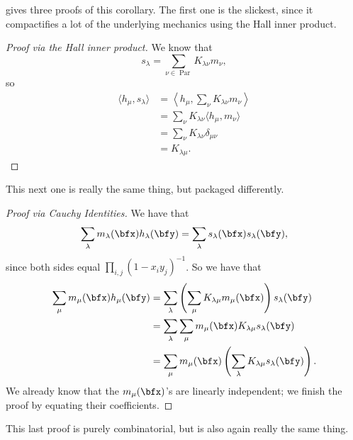\documentclass{article}
\DeclareMathOperator{\Par}{Par}
\begin{document}
\cite{Stanley} gives three proofs of this corollary. The first one is the slickest, since it compactifies a lot of the underlying mechanics using the Hall inner product.

\begin{proof}[Proof via the Hall inner product]
    We know that
    \[
        s_\lambda = \sum_{\nu\in\Par} K_{\lambda\nu} m_\nu,
    \]
    so 
    \begin{align*}
        \langle h_\mu, s_\lambda \rangle &= \left\langle h_\mu, \sum_\nu K_{\lambda\nu} m_\nu \right\rangle \\
                                         &=\sum_{\nu} K_{\lambda\nu} \langle h_\mu, m_\nu \rangle \\
                                         &=\sum_{\nu} K_{\lambda\nu} \delta_{\mu\nu} \\
                                         &= K_{\lambda\mu}.
    \end{align*}
\end{proof}

This next one is really the same thing, but packaged differently.

\begin{proof}[Proof via Cauchy Identities]
    We have that
    \[
        \sum_\lambda 
        m_\lambda(\bfx) h_\lambda(\bfy) 
        = 
        \sum_\lambda 
        s_\lambda(\bfx) s_\lambda(\bfy),
    \]
    since both sides equal $\prod_{i,j}(1-x_iy_j)^{-1}$.
    So we have that
    \begin{align*}
        \sum_\mu 
        m_\mu(\bfx)h_\mu(\bfy) 
        &= 
        \sum_\lambda 
        \left( 
            \sum_\mu K_{\lambda\mu} m_\mu(\bfx) 
        \right) 
        s_\lambda(\bfy) 
        \\
        &= 
        \sum_\lambda \sum_\mu 
        m_\mu(\bfx) K_{\lambda\mu} s_\lambda(\bfy) \\
        &= 
        \sum_\mu 
        m_\mu(\bfx) 
        \left(\sum_\lambda K_{\lambda\mu} s_\lambda(\bfy)\right).
    \end{align*}
    We already know that the $m_\mu(\bfx)$'s are linearly independent; we finish the proof by equating their coefficients.
\end{proof}

This last proof is purely combinatorial, but is also again really the same thing. 
\end{document}
